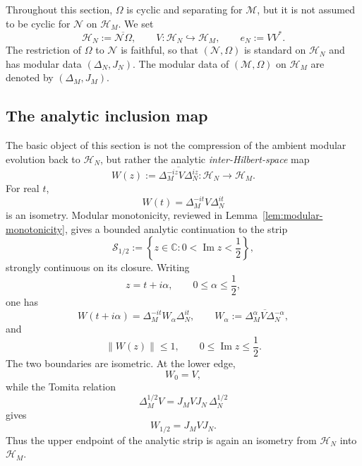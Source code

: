 \documentclass[a4paper,11pt]{article}
\theoremstyle{definition}
\begin{document}
Throughout this section, $\Omega$ is cyclic and separating for
$\mathcal M$, but it is not assumed to be cyclic for $\mathcal N$ on
$\mathcal H_M$. We set
\begin{equation}
    \mathcal H_N
    :=
    \overline{\mathcal N\Omega},
    \qquad
    V:\mathcal H_N\hookrightarrow\mathcal H_M,
    \qquad
    e_N:=VV^* .
    \label{eq:probing-HN}
\end{equation}
The restriction of $\Omega$ to $\mathcal N$ is faithful, so that
$(\mathcal N,\Omega)$ is standard on $\mathcal H_N$ and has modular data
$(\Delta_N,J_N)$. The modular data of $(\mathcal M,\Omega)$ on
$\mathcal H_M$ are denoted by $(\Delta_M,J_M)$.

\subsection{The analytic inclusion map}

The basic object of this section is not the compression of the ambient
modular evolution back to $\mathcal H_N$, but rather the analytic
\emph{inter-Hilbert-space} map
\begin{equation}
    W(z)
    :=
    \overline{
    \Delta_M^{-iz}V\Delta_N^{iz}}
    :
    \mathcal H_N\longrightarrow\mathcal H_M .
    \label{eq:Wz-definition}
\end{equation}
For real $t$,
\begin{equation}
    W(t)=\Delta_M^{-it}V\Delta_N^{it}
\end{equation}
is an isometry. Modular monotonicity, reviewed in
Lemma~\ref{lem:modular-monotonicity}, gives a bounded analytic continuation
to the strip
\begin{equation}
    \mathcal S_{1/2}
    :=
    \left\{
    z\in\mathbb C:
    0<\operatorname{Im}z<\frac12
    \right\},
\end{equation}
strongly continuous on its closure. Writing
\begin{equation}
    z=t+i\alpha,
    \qquad
    0\leq\alpha\leq\frac12 ,
\end{equation}
one has
\begin{equation}
    W(t+i\alpha)
    =
    \Delta_M^{-it}
    W_\alpha
    \Delta_N^{it},
    \qquad
    W_\alpha
    :=
    \overline{
    \Delta_M^\alpha V\Delta_N^{-\alpha}},
    \label{eq:W-alpha-strip}
\end{equation}
and
\begin{equation}
    \boxed{
    \|W(z)\|\leq1,
    \qquad
    0\leq\operatorname{Im}z\leq\frac12 .
    }
    \label{eq:W-strip-bound}
\end{equation}
The two boundaries are isometric. At the lower edge,
\begin{equation}
    W_0=V,
\end{equation}
while the Tomita relation
\begin{equation}
    \Delta_M^{1/2}V
    =
    J_MVJ_N\,\Delta_N^{1/2}
\end{equation}
gives
\begin{equation}
    \boxed{
    W_{1/2}=J_MVJ_N .
    }
    \label{eq:W-half}
\end{equation}
Thus the upper endpoint of the analytic strip is again an isometry from
$\mathcal H_N$ into $\mathcal H_M$.
\end{document}
